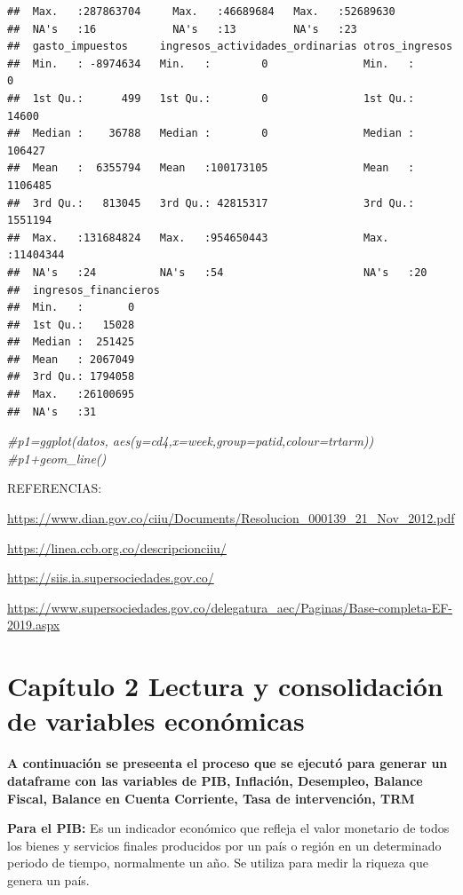 \documentclass[
  11pt,
]{article}
\newenvironment{Shaded}{\begin{snugshade}}{\end{snugshade}}
\newcommand{\CommentTok}[1]{\textcolor[rgb]{0.56,0.35,0.01}{\textit{#1}}}
\begin{document}
\begin{verbatim}
##  Max.   :287863704     Max.   :46689684   Max.   :52689630  
##  NA's   :16            NA's   :13         NA's   :23        
##  gasto_impuestos     ingresos_actividades_ordinarias otros_ingresos    
##  Min.   : -8974634   Min.   :        0               Min.   :       0  
##  1st Qu.:      499   1st Qu.:        0               1st Qu.:   14600  
##  Median :    36788   Median :        0               Median :  106427  
##  Mean   :  6355794   Mean   :100173105               Mean   : 1106485  
##  3rd Qu.:   813045   3rd Qu.: 42815317               3rd Qu.: 1551194  
##  Max.   :131684824   Max.   :954650443               Max.   :11404344  
##  NA's   :24          NA's   :54                      NA's   :20        
##  ingresos_financieros
##  Min.   :       0    
##  1st Qu.:   15028    
##  Median :  251425    
##  Mean   : 2067049    
##  3rd Qu.: 1794058    
##  Max.   :26100695    
##  NA's   :31
\end{verbatim}

\begin{Shaded}
\begin{Highlighting}[]
\CommentTok{#p1=ggplot(datos, aes(y=cd4,x=week,group=patid,colour=trtarm))}
\CommentTok{#p1+geom_line()}
\end{Highlighting}
\end{Shaded}

REFERENCIAS:

\url{https://www.dian.gov.co/ciiu/Documents/Resolucion_000139_21_Nov_2012.pdf}

\url{https://linea.ccb.org.co/descripcionciiu/}

\url{https://siis.ia.supersociedades.gov.co/}

\url{https://www.supersociedades.gov.co/delegatura_aec/Paginas/Base-completa-EF-2019.aspx}

\hypertarget{capuxedtulo-2-lectura-y-consolidaciuxf3n-de-variables-econuxf3micas}{%
\section{Capítulo 2 Lectura y consolidación de variables
económicas}\label{capuxedtulo-2-lectura-y-consolidaciuxf3n-de-variables-econuxf3micas}}

\textbf{A continuación se preseenta el proceso que se ejecutó para generar un dataframe con las variables de PIB, Inflación, Desempleo, Balance Fiscal, Balance en Cuenta Corriente, Tasa de intervención, TRM}

\textbf{Para el PIB:} Es un indicador económico que refleja el valor
monetario de todos los bienes y servicios finales producidos por un país
o región en un determinado periodo de tiempo, normalmente un año. Se
utiliza para medir la riqueza que genera un país.
\end{document}
